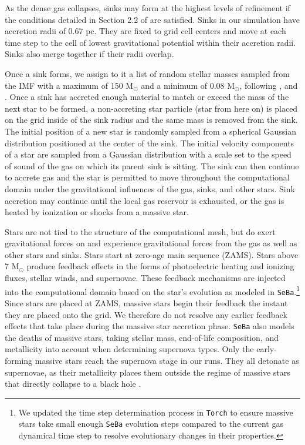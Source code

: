 \documentclass[twoside]{drexel-thesis}
\begin{document}
\begin{thesis}
As the dense gas collapses, sinks may form at the highest levels of refinement if the conditions detailed in Section 2.2 of \citet{federrath_modeling_2010-1} are satisfied. Sinks in our simulation have accretion radii of 0.67 pc. They are fixed to grid cell centers and move at each time step to the cell of lowest gravitational potential within their accretion radii. Sinks also merge together if their radii overlap.

Once a sink forms, we assign to it a list of random stellar masses sampled from the \citet{kroupa_initial_2002} IMF with a maximum of 150 M$_\odot$ and a minimum of 0.08 M$_\odot$, following \citet{weidner_maximum_2006}, \citet{sormani_simple_2017-1} and \citet{wall_collisional_2019}. Once a sink has accreted enough material to match or exceed the mass of the next star to be formed, a non-accreting star particle (star from here on) is placed on the grid inside of the sink radius and the same mass is removed from the sink. The initial position of a new star is randomly sampled from a spherical Gaussian distribution positioned at the center of the sink. The initial velocity components of a star are sampled from a Gaussian distribution with a scale set to the speed of sound of the gas on which its parent sink is sitting.
The sink can then continue to accrete gas and the star is permitted to move throughout the computational domain under the gravitational influences of the gas, sinks, and other stars. Sink accretion may continue until the local gas reservoir is exhausted, or the gas is heated by ionization or shocks from a massive star.

Stars are not tied to the structure of the computational mesh, but do exert gravitational forces on and experience gravitational forces from the gas as well as other stars and sinks. Stars start at zero-age main sequence (ZAMS). Stars above 7 M$_{\odot}$ produce feedback effects in the forms of photoelectric heating and ionizing fluxes, stellar winds, and supernovae. These feedback mechanisms are injected into the computational domain based on the star's evolution as modeled in \texttt{SeBa}.\footnote{We updated the time step determination process in \texttt{Torch} to ensure massive stars take small enough \texttt{SeBa} evolution steps compared to the current gas dynamical time step to resolve evolutionary changes in their properties.}
Since stars are placed at ZAMS, massive stars begin their feedback the instant they are placed onto the grid. We therefore do not resolve any earlier feedback effects that take place during the massive star accretion phase. \texttt{SeBa} also models the deaths of massive stars, taking stellar mass, end-of-life composition, and metallicity into account when determining supernova types. Only the early-forming massive stars reach the supernova stage in our runs. They all detonate as supernovae, as their metallicity places them outside the regime of massive stars that directly collapse to a black hole \citep{heger_how_2003}.


\end{thesis}
\end{document}
